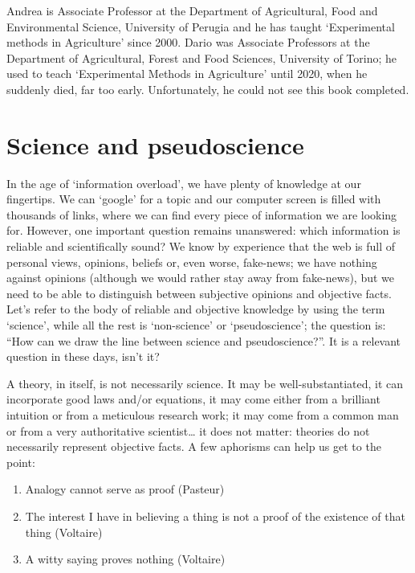\documentclass[a4paper,12pt,oneside]{book}
\providecommand{\tightlist}{%
  \setlength{\itemsep}{0pt}\setlength{\parskip}{0pt}}
\begin{document}
Andrea is Associate Professor at the Department of Agricultural, Food and Environmental Science, University of Perugia and he has taught `Experimental methods in Agriculture' since 2000. Dario was Associate Professors at the Department of Agricultural, Forest and Food Sciences, University of Torino; he used to teach `Experimental Methods in Agriculture' until 2020, when he suddenly died, far too early. Unfortunately, he could not see this book completed.

\hypertarget{science-and-pseudoscience}{%
\chapter{Science and pseudoscience}\label{science-and-pseudoscience}}

In the age of `information overload', we have plenty of knowledge at our fingertips. We can `google' for a topic and our computer screen is filled with thousands of links, where we can find every piece of information we are looking for. However, one important question remains unanswered: which information is reliable and scientifically sound? We know by experience that the web is full of personal views, opinions, beliefs or, even worse, fake-news; we have nothing against opinions (although we would rather stay away from fake-news), but we need to be able to distinguish between subjective opinions and objective facts. Let's refer to the body of reliable and objective knowledge by using the term `science', while all the rest is `non-science' or `pseudoscience'; the question is: ``How can we draw the line between science and pseudoscience?''. It is a relevant question in these days, isn't it?

A theory, in itself, is not necessarily science. It may be well-substantiated, it can incorporate good laws and/or equations, it may come either from a brilliant intuition or from a meticulous research work; it may come from a common man or from a very authoritative scientist\ldots{} it does not matter: theories do not necessarily represent objective facts. A few aphorisms can help us get to the point:

\begin{enumerate}
\def\labelenumi{\arabic{enumi}.}
\tightlist
\item
  Analogy cannot serve as proof (Pasteur)
\item
  The interest I have in believing a thing is not a proof of the existence of that thing (Voltaire)
\item
  A witty saying proves nothing (Voltaire)
\end{enumerate}
\end{document}
